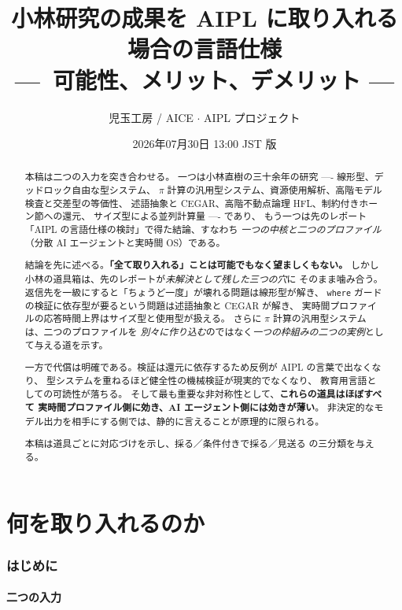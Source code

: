 \documentclass[11pt,a4paper]{ltjsarticle}
\title{小林研究の成果を AIPL に取り入れる場合の言語仕様\\
{\large ---\ 可能性、メリット、デメリット ---}}
\author{児玉工房 / AICE $\cdot$ AIPL プロジェクト}
\date{2026年07月30日 13:00 JST 版}
\theoremstyle{remark}
\begin{document}
\maketitle

\begin{abstract}
本稿は二つの入力を突き合わせる。
一つは小林直樹の三十余年の研究 ---- 線形型、デッドロック自由な型システム、
$\pi$ 計算の汎用型システム、資源使用解析、高階モデル検査と交差型の等価性、
述語抽象と CEGAR、高階不動点論理 HFL、制約付きホーン節への還元、
サイズ型による並列計算量 ---- であり、
もう一つは先のレポート「AIPL の言語仕様の検討」で得た結論、すなわち
\emph{一つの中核と二つのプロファイル}（分散 AI エージェントと実時間 OS）である。

結論を先に述べる。\textbf{「全て取り入れる」ことは可能でもなく望ましくもない。}
しかし小林の道具箱は、先のレポートが\emph{未解決として残した三つの穴}に
そのまま噛み合う。返信先を一級にすると「ちょうど一度」が壊れる問題は線形型が解き、
\texttt{where} ガードの検証に依存型が要るという問題は述語抽象と CEGAR が解き、
実時間プロファイルの応答時間上界はサイズ型と使用型が扱える。
さらに $\pi$ 計算の汎用型システムは、二つのプロファイルを
\emph{別々に作り込む}のではなく\emph{一つの枠組みの二つの実例}として与える道を示す。

一方で代償は明確である。検証は還元に依存するため反例が AIPL の言葉で出なくなり、
型システムを重ねるほど健全性の機械検証が現実的でなくなり、
教育用言語としての可読性が落ちる。
そして最も重要な非対称性として、\textbf{これらの道具はほぼすべて
実時間プロファイル側に効き、AI エージェント側には効きが薄い}。
非決定的なモデル出力を相手にする側では、静的に言えることが原理的に限られる。

本稿は道具ごとに対応づけを示し、採る／条件付きで採る／見送る の三分類を与える。
\end{abstract}

\tableofcontents

\part{何を取り入れるのか}

\section{はじめに}

\subsection{二つの入力}
\end{document}
